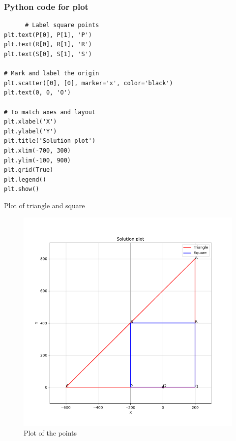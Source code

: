 \documentclass{beamer}
\begin{document}
 \begin{frame}[fragile]
       \frametitle{Python code for plot}
       \begin{lstlisting}
      # Label square points
plt.text(P[0], P[1], 'P')
plt.text(R[0], R[1], 'R')
plt.text(S[0], S[1], 'S')

# Mark and label the origin
plt.scatter([0], [0], marker='x', color='black')
plt.text(0, 0, 'O')

# To match axes and layout
plt.xlabel('X')
plt.ylabel('Y')
plt.title('Solution plot')
plt.xlim(-700, 300)
plt.ylim(-100, 900)
plt.grid(True)
plt.legend()
plt.show()
    \end{lstlisting}
 \end{frame}
     \begin{frame}{Plot of triangle and square}
       \begin{figure}
           \centering
           \includegraphics[width=0.7\linewidth]{figs/fig1.png}
           \caption{Plot of the points}
           \label{fig:placeholder}
       \end{figure}
         
     \end{frame}
\end{document}
